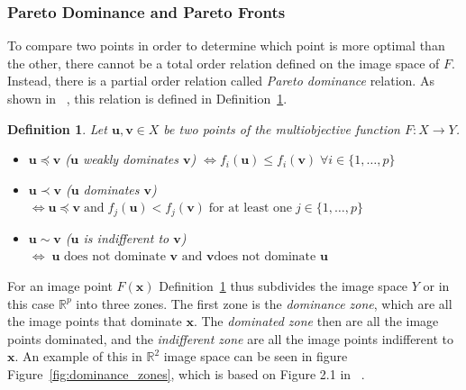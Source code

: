 \documentclass[a4paper,10pt]{article}
\newtheorem{definition}{Definition}
\renewcommand{\vec}[1]{\mathbf{#1}}
\newcommand{\figref}[1]{Figure~\ref{#1}}
\newcommand{\defref}[1]{Definition~\ref{#1}}
\begin{document}
    \subsubsection{Pareto Dominance and Pareto Fronts} \label{sec:pareto}
    
    To compare two points in order to determine which point is more
    optimal than the other, there cannot be a total order relation defined
    on the image space of $F$.
    Instead, there is a partial order relation called \emph{Pareto dominance}
    relation.
    As shown in ~\cite{multiobjective}, this relation is defined in
    \defref{def:pareto_dominance}.
    
    \begin{definition}
        \label{def:pareto_dominance}
        Let $\vec{u},\vec{v} \in X$ be two points of the multiobjective
        function $F: X \rightarrow Y$.
        \begin{itemize}
            \item $\vec{u} \preceq \vec{v}$ ($\vec{u}$ weakly dominates $\vec{v}$)
            $\Longleftrightarrow f_i(\vec{u}) \leq f_i(\vec{v}) \; \forall i \in \{1,\dots,p\}$   

            \item $\vec{u} \prec \vec{v}$ ($\vec{u}$ dominates $\vec{v}$)
            $\Longleftrightarrow \vec{u} \preceq \vec{v} \; \text{and} \; 
            f_j(\vec{u}) < f_j(\vec{v}) \; \text{for at least one} \; j \in \{1,\dots,p\}$   

            \item $\vec{u} \sim \vec{v}$ ($\vec{u}$ is indifferent to $\vec{v}$)
            $\Longleftrightarrow \; \text{$\vec{u}$ does not dominate $\vec{v}$ and $\vec{v}$
            does not dominate $\vec{u}$}$  
        \end{itemize}
    \end{definition}

    For an image point $F(\vec{x})$ \defref{def:pareto_dominance} thus
    subdivides the image space $Y$ or in this case $\mathbb{R}^p$ into three zones.
    The first zone is the \emph{dominance zone}, which are all the image
    points that dominate $\vec{x}$.
    The \emph{dominated zone} then are all the image points dominated, and
    the \emph{indifferent zone} are all the image points indifferent to $\vec{x}$.
    An example of this in $\mathbb{R}^2$ image space can be seen in figure
    \figref{fig:dominance_zones}, which is based on Figure 2.1 in ~\cite{multiobjective}.
   
\end{document}
